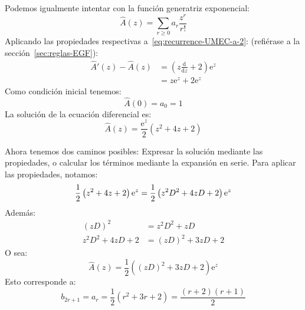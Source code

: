   Podemos igualmente intentar
  con la función generatriz exponencial:%
  \begin{equation*}
    \widehat{A}(z)
      = \sum_{r \ge 0} a_r \frac{z^r}{r!}
  \end{equation*}
  Aplicando las propiedades respectivas
  a~\eqref{eq:recurrence-UMEC-a-2}:
  (refiérase a la sección~\ref{sec:reglas-EGF}):
  \begin{align*}
    \widehat{A}'(z) - \widehat{A}(z)
      &= \left(
	   z \frac{\mathrm{d}}{\mathrm{d} z} + 2
	 \right) \mathrm{e}^z \\
      &= z \mathrm{e}^z + 2 \mathrm{e}^z
  \end{align*}
  Como condición inicial tenemos:
  \begin{equation*}
    \widehat{A}(0)
      = a_0
      = 1
  \end{equation*}
  La solución de la ecuación diferencial es:%
  \begin{equation*}
    \widehat{A}(z)
      = \frac{\mathrm{e}^z}{2} (z^2 + 4 z + 2)
  \end{equation*}

  Ahora tenemos dos caminos posibles:
  Expresar la solución mediante las propiedades,
  o calcular los términos mediante la expansión en serie.
  Para aplicar las propiedades,
  notamos:
  \begin{equation*}
    \frac{1}{2} \left( z^2 + 4 z + 2 \right) \mathrm{e}^z
      = \frac{1}{2}
	  \left( z^2 D^2 + 4 z D + 2 \right)
	  \mathrm{e}^z \\
  \end{equation*}
  Además:
  \begin{align*}
    (z D)^2
      &= z^2 D^2 + z D \\
    z^2 D^2 + 4 z D + 2
      &= (z D)^2 + 3 z D + 2
  \end{align*}
  O sea:
  \begin{equation*}
    \widehat{A}(z)
      = \frac{1}{2}
	  \left( (z D)^2 + 3 z D + 2 \right)
	  \mathrm{e}^z
  \end{equation*}
  Esto corresponde a:
  \begin{equation*}
    b_{2 r + 1}
      = a_r
      = \frac{1}{2} (r^2 + 3 r + 2)
      = \frac{(r + 2) (r + 1)}{2}
  \end{equation*}

